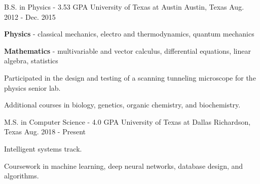 

\begin{cventries}

  \cventry
    {B.S. in Physics - 3.53 GPA} %
    {University of Texas at Austin} %
    {Austin, Texas} %
    {Aug. 2012 - Dec. 2015} %
    {
      \begin{cvitems} %
        \item {
			\textbf{Physics} - classical mechanics, electro and
			thermodynamics, quantum mechanics
		}
        \item {
			\textbf{Mathematics} - multivariable and vector
			calculus,
			differential equations, linear algebra,
			statistics
		}
        \item {
			Participated in the design and testing of a scanning
			tunneling microscope for the physics senior lab.
		}
        \item {
			Additional courses in biology, genetics, organic
			chemistry, and biochemistry.
		}
      \end{cvitems}
    }

  \cventry
    {M.S. in Computer Science - 4.0 GPA} %
    {University of Texas at Dallas} %
    {Richardson, Texas} %
    {Aug. 2018 - Present} %
    {
      \begin{cvitems} %
        \item {Intelligent systems track.}
        \item {
			Coursework in machine learning, deep neural networks,
			database design, and algorithms.
		}
      \end{cvitems}
    }

\end{cventries}
